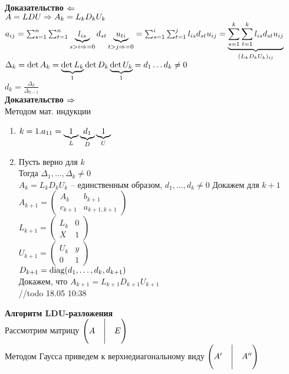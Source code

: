 \documentclass[12pt]{article}
\begin{document}
\textbf{Доказательство $\Lto$}\\
$A = LDU \Rto A_k = L_kD_kU_k$\\
$a_{ij} = \sum_{s=1}^n \sum_{t=1}^n \ub{s > i \Rto =0}{l_{is}}d_{st}\ub{t > j \Rto =0}{u_{ti}} = \sum_{s=1}^i \sum_{t=1}^j l_{is}d_{st}u_{ij} = \ub{(L_kD_kU_k)_{ij}}{\sum_{s=1}^k\sum_{t=1}^k l_{is}d_{st}u_{ij}}$\\
$\Delta_k = \det A_k = \ub{1}{\det L_k} \det D_k \ub{1}{\det U_k} = d_1 \ldots d_k \neq 0$\\
$d_k = \frac{\Delta_k}{\Delta_{k-1}}$\\
\textbf{Доказательство $\Rto$}\\
Методом мат. индукции
\begin{enumerate}
    \item $k=1. a_{11} = \ub L1\ub{D}{d_1}\ub U1$
    \item Пусть верно для $k$\\
    Тогда $\Delta_1, \ldots, \Delta_k \neq 0$\\
    $A_k = L_kD_kU_k$ -- единственным образом, $d_1, \ldots, d_k \neq 0$
    Докажем для $k+1$\\
    $A_{k+1} = \begin{pmatrix}
        A_k & b_{k+1}\\
        c_{k+1} & a_{k+1, k+1}
    \end{pmatrix}$\\
    $L_{k+1} = \begin{pmatrix}
        L_k & 0\\
        X & 1
    \end{pmatrix}$\\
    $U_{k+1} = \begin{pmatrix}
        U_k & y\\
        0 & 1
    \end{pmatrix}$\\
    $D_{k+1} = \nm{diag}(d_1, \ldots, d_k, d_{k+1})$\\
    Докажем, что $A_{k+1} = L_{k+1}D_{k+1}U_{k+1}$\\
    //todo 18.05 10:38
\end{enumerate}
\textbf{Алгоритм LDU-разложения}\\
Рассмотрим матрицу $\begin{pmatrix}
    A & \vl & E
\end{pmatrix}$\\
Методом Гаусса приведем к верхнедиагональному виду $\begin{pmatrix}
    A' & \vl & A''
\end{pmatrix}$\\
\end{document}
